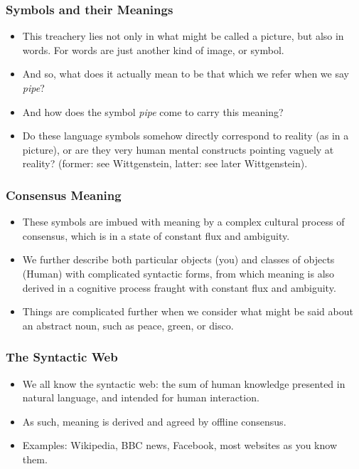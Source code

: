 \documentclass{beamer}
\begin{document}
\begin{frame}
\frametitle{Symbols and their Meanings}

\begin{itemize}
  \item This treachery lies not only in what might be called a picture, but also
  in words. For words are just another kind of image, or symbol.
  \item And so, what does it actually mean to be that which we refer when we say
  \emph{pipe}?
  \item And how does the symbol \emph{pipe} come to carry this meaning?
  \item Do these language symbols somehow
  directly correspond to reality (as in a picture), or are they very human mental
  constructs pointing vaguely at reality? (former: see Wittgenstein, latter: see
  later Wittgenstein).
\end{itemize}
\end{frame}

\begin{frame}
\frametitle{Consensus Meaning}

\begin{itemize}
  \item These symbols are imbued with meaning by a complex cultural process of
  consensus, which is in a state of constant flux and ambiguity.
  \item We further describe both particular objects (you) and classes of objects
  (Human) with complicated syntactic forms, from which meaning is also derived
  in a cognitive process fraught with constant flux and ambiguity.
  \item Things are complicated further when we consider what might be said 
  about an abstract noun, such as peace, green, or disco.
\end{itemize}
\end{frame}

\begin{frame}
\frametitle{The Syntactic Web}
\begin{itemize}
  \item We all know the syntactic web: the sum of human knowledge presented in natural 
  language, and intended for human interaction.
  \item As such, meaning is derived and agreed by offline consensus.
  \item Examples: Wikipedia, BBC news, Facebook, most websites as you know them.
\end{itemize}
\end{frame}
\end{document}
